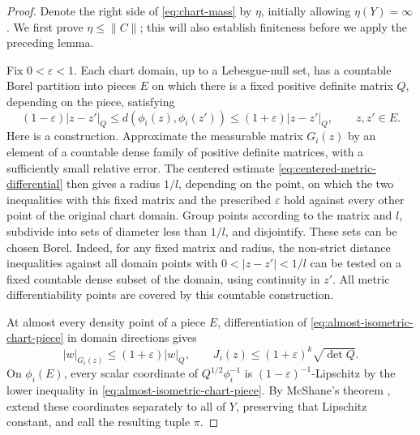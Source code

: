 \begin{proof}
Denote the right side of \eqref{eq:chart-mass} by \(\eta\), initially
allowing \(\eta(Y)=\infty\). We first prove \(\eta\le\|C\|\); this
will also establish finiteness before we apply the preceding lemma.

Fix \(0<\varepsilon<1\). Each chart domain, up to a Lebesgue-null set,
has a countable Borel partition into pieces \(E\) on which there is a
fixed positive definite matrix \(Q\), depending on the piece, satisfying
\begin{equation}
\label{eq:almost-isometric-chart-piece}
 (1-\varepsilon)|z-z'|_Q
 \le d(\phi_i(z),\phi_i(z'))
 \le(1+\varepsilon)|z-z'|_Q,
 \qquad z,z'\in E.
\end{equation}
Here is a construction. Approximate the measurable matrix \(G_i(z)\)
by an element of a countable dense family of positive definite matrices,
with a sufficiently small relative error. The centered estimate
\eqref{eq:centered-metric-differential} then gives a radius \(1/l\),
depending on the point, on which the two inequalities with this fixed
matrix and the prescribed \(\varepsilon\) hold against every other
point of the original chart domain. Group points according to the
matrix and \(l\), subdivide into sets of diameter less than \(1/l\),
and disjointify. These sets can be chosen Borel. Indeed, for any fixed
matrix and radius, the non-strict distance inequalities against all
domain points with \(0<|z-z'|<1/l\) can be tested on a fixed countable
dense subset of the domain, using continuity in \(z'\). All metric
differentiability points are covered by this countable construction.

At almost every density point of a piece \(E\), differentiation of
\eqref{eq:almost-isometric-chart-piece} in domain directions gives
\[
 |w|_{G_i(z)}\le(1+\varepsilon)|w|_Q,
 \qquad
 J_i(z)\le(1+\varepsilon)^k\sqrt{\det Q}.
\]
On \(\phi_i(E)\), every scalar coordinate of
\(Q^{1/2}\phi_i^{-1}\) is \((1-\varepsilon)^{-1}\)-Lipschitz by the
lower inequality in \eqref{eq:almost-isometric-chart-piece}.
By McShane's theorem \cite[Theorem~2.1]{Rieffel2006}, extend these
coordinates separately to all of \(Y\), preserving that Lipschitz
constant, and call the resulting tuple \(\pi\).


\end{proof}
